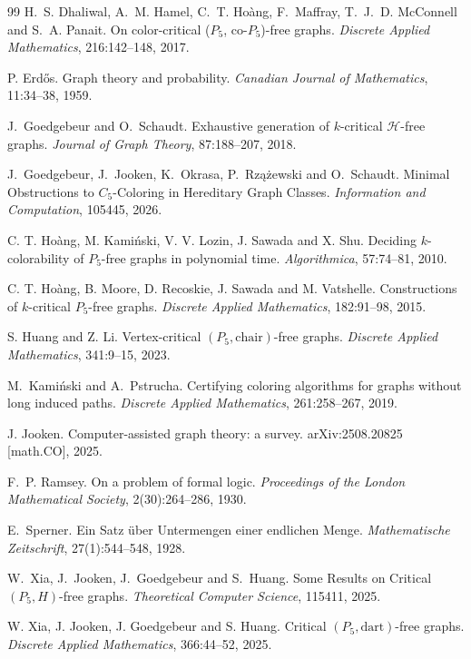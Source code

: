 \documentclass[10pt]{article}
\theoremstyle{definition}
\begin{document}
\begin{thebibliography}{99}
H.~S. Dhaliwal, A.~M. Hamel, C.~T. Ho\`{a}ng, F.~Maffray, T.~J.~D. McConnell
and S.~A. Panait.
On color-critical (${P}_5$, co-${P_5}$)-free graphs.
\textit{Discrete Applied Mathematics}, 216:142--148, 2017.
        
P. Erd{\H{o}}s.
Graph theory and probability.
\textit{Canadian Journal of Mathematics}, 11:34--38, 1959.


J.~Goedgebeur and O.~Schaudt.
Exhaustive generation of $k$-critical $\mathcal{H}$-free graphs.
\textit{Journal of Graph Theory}, 87:188--207, 2018.

J.~Goedgebeur, J.~Jooken, K.~Okrasa, P.~Rz{\k{a}}{\.z}ewski and O.~Schaudt.
Minimal Obstructions to $C_5$-Coloring in Hereditary Graph Classes.
\textit{Information and Computation}, 105445, 2026.


C. T. Ho{\`a}ng, M. Kami\'{n}ski, V. V. Lozin, J. Sawada and X. Shu.
Deciding $k$-colorability of {$P_5$}-free graphs in polynomial time.
\textit{Algorithmica}, 57:74--81, 2010.


C. T. Ho{\`a}ng, B. Moore, D. Recoskie, J. Sawada and M. Vatshelle.
Constructions of $k$-critical $P_5$-free graphs.
\textit{Discrete Applied Mathematics}, 182:91--98, 2015.

        
S. Huang and Z. Li. 
Vertex-critical $(P_5, \text{chair})$-free graphs.
\textit{Discrete Applied Mathematics}, 341:9--15, 2023.

M.~Kami\'nski and A.~Pstrucha.
Certifying coloring algorithms for graphs without long induced paths.
\textit{Discrete Applied Mathematics}, 261:258--267, 2019.

J. Jooken.
Computer-assisted graph theory: a survey.
arXiv:2508.20825 [math.CO], 2025.

F.~P. Ramsey.
On a problem of formal logic.
\textit{Proceedings of the London Mathematical Society}, 2(30):264--286, 1930.

E.~Sperner.
Ein Satz \"uber Untermengen einer endlichen Menge.
\textit{Mathematische Zeitschrift}, 27(1):544--548, 1928.

W.~Xia, J.~Jooken, J.~Goedgebeur and S.~Huang.
Some Results on Critical $(P_5,H)$-free graphs.
\textit{Theoretical Computer Science}, 115411, 2025.
        
W. Xia, J. Jooken, J. Goedgebeur and S. Huang. 
Critical $(P_5,\text{dart})$-free graphs. 
\textit{Discrete Applied Mathematics}, 366:44--52, 2025.
	\end{thebibliography}
\end{document}
